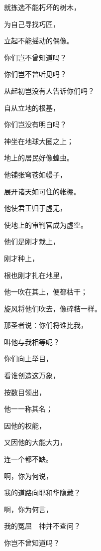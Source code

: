 {\par }{\Q 就拣选不能朽坏的树木，
\par }{\Q 为自己寻找巧匠，
\par }{\Q 立起不能摇动的偶像。
\par }{\BB \par }{\Q {}你们岂不曾知道吗？
\par }{\Q 你们岂不曾听见吗？
\par }{\Q 从起初岂没有人告诉你们吗？
\par }{\Q 自从立地的根基，
\par }{\Q 你们岂没有明白吗？
\par }{\Q {}神坐在地球大圈之上；
\par }{\Q 地上的居民好像蝗虫。
\par }{\Q 他铺张穹苍如幔子，
\par }{\Q 展开诸天如可住的帐棚。
\par }{\Q {}他使君王归于虚无，
\par }{\Q 使地上的审判官成为虚空。
\par }{\BB \par }{\Q {}他们是刚才栽上，
\par }{\Q 刚才种上，
\par }{\Q 根也刚才扎在地里，
\par }{\Q 他一吹在其上，便都枯干；
\par }{\Q 旋风将他们吹去，像碎秸一样。
\par }{\BB \par }{\Q {}那圣者说：你们将谁比我，
\par }{\Q 叫他与我相等呢？
\par }{\Q {}你们向上举目，
\par }{\Q 看谁创造这万象，
\par }{\Q 按数目领出，
\par }{\Q 他一一称其名；
\par }{\Q 因他的权能，
\par }{\Q 又因他的大能大力，
\par }{\Q 连一个都不缺。
\par }{\BB \par }{\Q {}啊，你为何说，
\par }{\Q 我的道路向耶和华隐藏？
\par }{啊，你为何言，
\par }{\Q 我的冤屈　神并不查问？
\par }{\Q {}你岂不曾知道吗？
}
